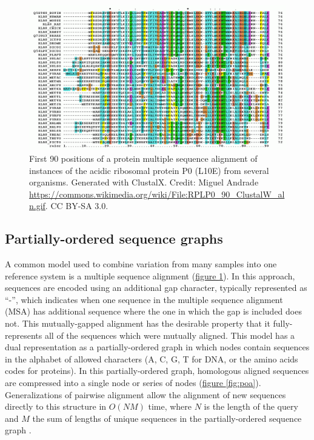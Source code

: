 \documentclass{article}
\begin{document}
\begin{figure}[t]
\centering
\includegraphics[width=1.0\textwidth]{figures/RPLP0_90_ClustalW_aln}
\caption{\label{fig:msa}
  First 90 positions of a protein multiple sequence alignment of instances of the acidic ribosomal protein P0 (L10E) from several organisms. Generated with ClustalX. Credit: Miguel Andrade \url{https://commons.wikimedia.org/wiki/File:RPLP0_90_ClustalW_aln.gif}. CC BY-SA 3.0.
}
\end{figure}

\subsection{Partially-ordered sequence graphs}

A common model used to combine variation from many samples into one reference system is a multiple sequence alignment (\hyperref[fig:msa]{figure \ref{fig:msa}}). In this approach, sequences are encoded using an additional gap character, typically represented as ``-'', which indicates when one sequence in the multiple sequence alignment (MSA) has additional sequence where the one in which the gap is included does not. This mutually-gapped alignment has the desirable property that it fully-represents all of the sequences which were mutually aligned. This model has a dual representation as a partially-ordered graph in which nodes contain sequences in the alphabet of allowed characters (A, C, G, T for DNA, or the amino acids codes for proteins). In this partially-ordered graph, homologous aligned sequences are compressed into a single node or series of nodes (\hyperref[fig:poa]{figure \ref{fig:poa}}). Generalizations of pairwise alignment \cite{gotoh1982} allow the alignment of new sequences directly to this structure in $O(NM)$ time, where $N$ is the length of the query and $M$ the sum of lengths of unique sequences in the partially-ordered sequence graph \cite{lee2002POA}.
\end{document}
